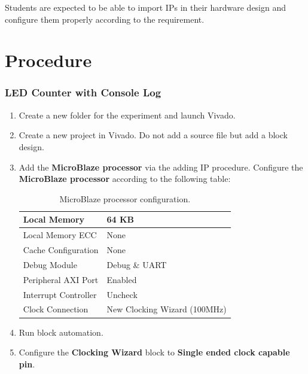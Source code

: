 \documentclass[11pt,letterpaper,titlepage]{article}
\begin{document}
Students are expected to be able to import IPs in their hardware design and configure them properly according to the requirement.

\part{Procedure}

\section{LED Counter with Console Log}

\begin{enumerate}
    \item Create a new folder for the experiment and launch Vivado.
    
    \item Create a new project in Vivado. Do not add a source file but add a block design.
    
    \item Add the \textbf{MicroBlaze processor} via the adding IP procedure. Configure the \textbf{MicroBlaze processor} according to the following table:
    
    \begin{table}[ht]
    \centering
    \begin{tabular}{@{}ll@{}}
    \toprule
    Local Memory         & 64 KB                        \\ \midrule
    Local Memory ECC     & None                         \\ \midrule
    Cache Configuration  & None                         \\ \midrule
    Debug Module         & Debug \& UART                \\ \midrule
    Peripheral AXI Port  & Enabled                      \\ \midrule
    Interrupt Controller & Uncheck                      \\ \midrule
    Clock Connection     & New Clocking Wizard (100MHz) \\ \bottomrule
    \end{tabular}
    \caption{MicroBlaze processor configuration.}
    \end{table}
    
    \item Run block automation.
    
    \item Configure the \textbf{Clocking Wizard} block to \textbf{Single ended clock capable pin}.
    

\end{enumerate}
\end{document}
